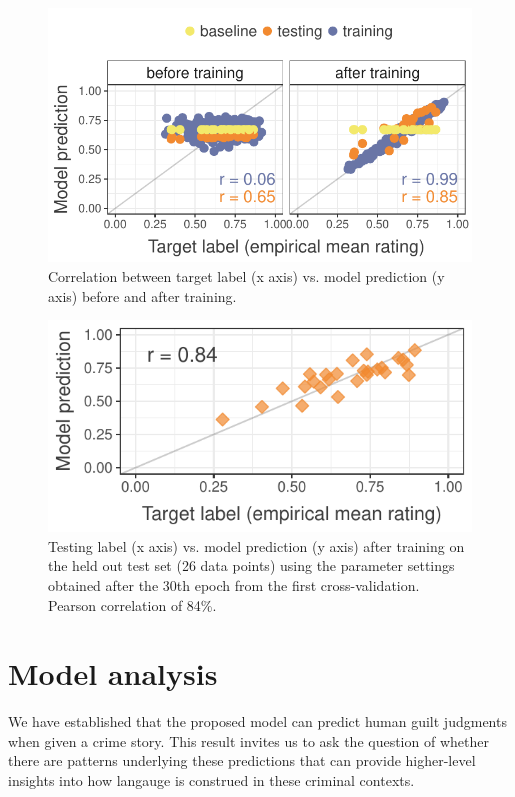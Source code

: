 \documentclass[11pt,a4paper]{article}
\begin{document}
\begin{figure}
  \includegraphics[width=\linewidth]{graphs/cv0-pred-target-epoch0-29.pdf}
  \caption{Correlation between target label (x axis) vs. model prediction (y axis) before and after training.}
  \label{fig:corr-cv0}
\end{figure}

\begin{figure}
  \includegraphics[width=\linewidth]{graphs/test-corr.pdf}
  \caption{Testing label (x axis) vs. model prediction (y axis) after training on the held out test set (26 data points) using the parameter settings obtained after the 30th epoch from the first cross-validation. Pearson correlation of 84\%.}
  \label{fig:test-corr}
\end{figure}


\section{Model analysis}

We have established that the proposed model can predict human guilt judgments when given a crime story. This result invites us to ask the question of whether there are patterns underlying these predictions that can provide higher-level insights into how langauge is construed in these criminal contexts. 
\end{document}
